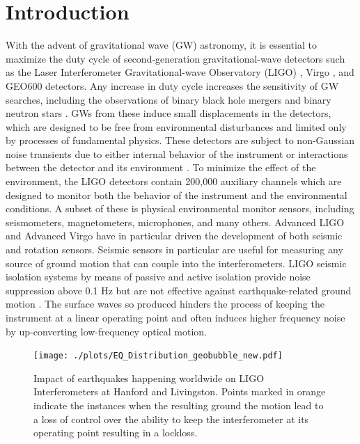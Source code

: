 \documentclass[twocolumn, aps, superscriptaddress]{revtex4}
\begin{document}
\section{Introduction}
With the advent of gravitational wave (GW) astronomy, it is essential to maximize the duty cycle of second-generation gravitational-wave detectors such as the Laser Interferometer Gravitational-wave Observatory (LIGO) \cite{aligo}, Virgo \cite{avirgo}, and GEO600 \cite{Gr2010} detectors.
Any increase in duty cycle increases the sensitivity of GW searches, including the observations of binary black hole mergers \cite{AbEA2016a,AbEA2016e,AbEA2017a,AbEA2017c} and binary neutron stars \cite{AbEA2017b}. GWs from these induce small displacements in the detectors, which are designed to be free from environmental disturbances and limited only by processes of fundamental physics.
These detectors are subject to non-Gaussian noise transients due to either internal behavior of the instrument or interactions between the detector and its environment \cite{AbEA2016f}. To minimize the effect of the environment, the LIGO detectors contain 200,000 auxiliary channels which are designed to monitor both the behavior of the instrument and the environmental conditions.
A subset of these is physical environmental monitor sensors, including seismometers, magnetometers, microphones, and many others. Advanced LIGO \cite{aligo} and  Advanced Virgo \cite{avirgo} have in particular driven the development of both seismic \cite{BeCa2016} and rotation \cite{VeHa2014} sensors. Seismic sensors in particular are useful for measuring any source of ground motion that can couple into the interferometers. LIGO seismic isolation systems by means of passive and active isolation provide noise suppression above 0.1 Hz \cite{AbAd2002,StAb2009,MaLa2015} but are not effective against earthquake-related ground motion \cite{CoSt2015,CoEa2017}. The surface waves so produced hinders the process of keeping the instrument at a linear operating point and often induces higher frequency noise by up-converting low-frequency optical motion.

\begin{figure}[!htb]
  \texttt{[image: ./plots/EQ\_Distribution\_geobubble\_new.pdf]}
 \caption{Impact of earthquakes happening worldwide on LIGO Interferometers at Hanford
and Livingston. Points marked in orange indicate the instances when the resulting ground the motion lead to a loss of control over the ability to keep the interferometer at its operating point resulting in a lockloss.}
 \label{fig:eq_worldwide}
\end{figure}
\end{document}
